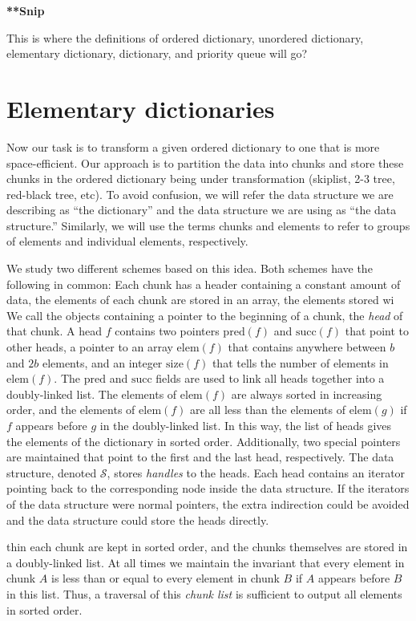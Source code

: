 \documentclass{DIKU-article}
\newcommand{\seclabel}[1]{\label{sec:#1}}
\newcommand{\Pred}{\mathrm{pred}}
\newcommand{\Succ}{\mathrm{succ}}
\newcommand{\Elem}{\mathrm{elem}}
\newcommand{\Size}{\mathrm{size}}
\begin{document}
\noindent\textbf{**Snip}


This is where the definitions of ordered dictionary, unordered
dictionary, elementary dictionary, dictionary, and priority queue will
go?

\section{Elementary dictionaries}%
\seclabel{elementary-dictionaries}

Now our task is to transform a given ordered dictionary to one that is
more space-efficient.  Our approach is to partition the data into
chunks and store these chunks in the ordered dictionary being under
transformation (skiplist, 2-3 tree, red-black tree, etc).  To avoid
confusion, we will refer the data structure we are describing as ``the
dictionary'' and the data structure we are using as ``the data
structure.''  Similarly, we will use the terms chunks and elements to
refer to groups of elements and individual elements, respectively.  

We study two different schemes based on this idea.  Both schemes have
the following in common:  Each chunk has a header containing a
constant amount of data, the elements of each chunk are stored in an
array, the elements stored wi
We call the objects containing a pointer to the beginning of a chunk,
the \emph{head} of that chunk.  A head $f$ contains two pointers
$\Pred(f)$ and $\Succ(f)$ that point to other heads, a pointer to an
array $\Elem(f)$ that contains anywhere between $b$ and $2b$ elements,
and an integer $\Size(f)$ that tells the number of elements in
$\Elem(f)$.  The $\Pred$ and $\Succ$ fields are used to link all heads
together into a doubly-linked list.  The elements of $\Elem(f)$ are
always sorted in increasing order, and the elements of $\Elem(f)$ are
all less than the elements of $\Elem(g)$ if $f$ appears before $g$ in
the doubly-linked list.  In this way, the list of heads gives the
elements of the dictionary in sorted order.  Additionally, two special
pointers are maintained that point to the first and the last head,
respectively.  The data structure, denoted $\mathcal{S}$, stores
\emph{handles} to the heads.  Each head contains an iterator pointing
back to the corresponding node inside the data structure.  If the
iterators of the data structure were normal pointers, the extra
indirection could be avoided and the data structure could store the
heads directly.

thin each chunk are kept in sorted order,
and the chunks themselves are stored in a doubly-linked list.  At all
times we maintain the invariant that every element in chunk $A$ is
less than or equal to every element in chunk $B$ if $A$ appears before
$B$ in this list.  Thus, a traversal of this \emph{chunk list} is
sufficient to output all elements in sorted order.
\end{document}
